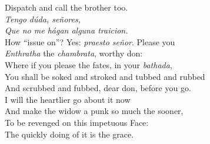 \documentclass[a4paper,oneside,12pt]{memoir}
\begin{document}
\begin{drama*}
Dispatch and call the brother too.\\
\surlyspeaks {} \emph{Tengo d\'{u}da, se\~{n}ores,\\
Que no me h\'{a}gan alguna traicion.}\\
\subtlespeaks How ``issue on''? Yes: \emph{praesto se\~{n}or}. Please you\\
\emph{Enthratha} the \emph{chambrata}, worthy don:\\
Where if you please the fates, in your \emph{bathada},\\
You shall be soked and stroked and tubbed and rubbed\\
And scrubbed and fubbed, dear don, before you go.\\
I will the heartlier go about it now\\
And make the widow a punk so much the sooner,\\
To be revenged on this impetuous Face:\\
The quickly doing of it is the grace.\\
\scene


\end{drama*}
\end{document}
